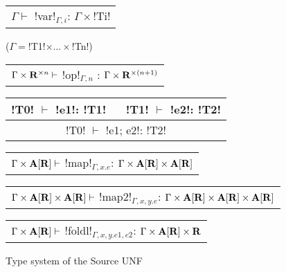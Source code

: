 \begin{figure*}[tb]
    \centering
    \begin{tabular}{c} 
    \\\hline
    $\Gamma \vdash$ !var!$_{\Gamma,i}$: $\Gamma\times$!Ti!
    \end{tabular}($\Gamma=$!T1!$\times\ldots\times$!Tn!)
    \hspace{0.5cm}
    \begin{tabular}{c}
        \\\hline
        $\Gamma\times\mathbf{R}^{\times n} \vdash$ !op!$_{\Gamma,n}$ : $\Gamma\times\mathbf{R}^{\times(n+1)}$
    \end{tabular}

    \begin{tabular}{c}
    !T0! $\vdash$ !e1!: !T1! $\quad$ !T1! $\vdash$ !e2!: !T2! \\\hline
    !T0! $\vdash$ !e1; e2!: !T2!
    \end{tabular}
    \hspace{0.5cm}
    \begin{tabular}{c}
        \\\hline  
        $\Gamma \times \mathbf{A}[\mathbf{R}] \vdash$ !map!$_{\Gamma, x.e}$: $\Gamma \times \mathbf{A}[\mathbf{R}] \times \mathbf{A}[\mathbf{R}]$
    \end{tabular}

    \begin{tabular}{c}
        \\\hline  
        $\Gamma \times \mathbf{A}[\mathbf{R}] \times \mathbf{A}[\mathbf{R}] \vdash$ !map2!$_{\Gamma, x,y.e}$: $\Gamma \times \mathbf{A}[\mathbf{R}] \times \mathbf{A}[\mathbf{R}] \times \mathbf{A}[\mathbf{R}]$
    \end{tabular}

    \begin{tabular}{c}
        \\\hline  
        $\Gamma \times \mathbf{A}[\mathbf{R}] \vdash$ !foldl!$_{\Gamma, x,y.e1, e2}$: $\Gamma \times \mathbf{A}[\mathbf{R}] \times \mathbf{R}$
    \end{tabular}
    \vspace{-0.2cm}
    \caption{Type system of the Source UNF}
    \vspace{-0.4cm}
    \label{fig:source_unf_typesystem}
\end{figure*}